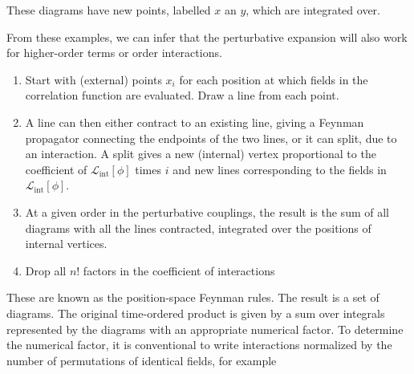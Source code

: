 \documentclass[11pt]{article}
\theoremstyle{definition}
\begin{document}
\begin{center}
\end{center}
These diagrams have new points, labelled $x$ an $y$, which are integrated over.

From these examples, we can infer that the perturbative expansion will also work for higher-order terms or order interactions.


\begin{enumerate}[leftmargin=*]
    \item Start with (external) points \( x_i \) for each position at which fields in the correlation function are evaluated. Draw a line from each point.
    
    \item A line can then either contract to an existing line, giving a Feynman propagator connecting the endpoints of the two lines, or it can split, due to an interaction. A split gives a new (internal) vertex proportional to the coefficient of \( \mathcal{L}_{\text{int}}[\phi] \) times \( i \) and new lines corresponding to the fields in \( \mathcal{L}_{\text{int}}[\phi] \).
    \item At a given order in the perturbative couplings, the result is the sum of all diagrams with all the lines contracted, integrated over the positions of internal vertices.
    \item Drop all $n!$ factors in the coefficient of interactions
\end{enumerate}


These are known as the position-space Feynman rules. The result is a set of diagrams. The original time-ordered product is given by a sum over integrals represented by the diagrams with an appropriate numerical factor. To determine the numerical factor, it is conventional to write interactions normalized by the number of permutations of identical fields, for example
\end{document}
